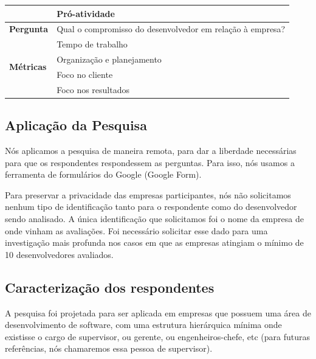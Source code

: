 \begin{table}[h]
\begin{tabular}{|p{2cm}|p{6.25cm}|p{6.25cm}|}
		& \multicolumn{2}{l|}{Pró-atividade}                                                                      \\ \hline\hline
		\textbf{Pergunta}                  & \multicolumn{2}{l|}{\parbox{12cm}{Qual o compromisso do desenvolvedor em relação à empresa?}}                          \\ \hline
		\multirow{4}{*}{\textbf{Métricas}} & \multicolumn{2}{l|}{Tempo de trabalho}                                                                  \\ \cline{2-3} 
		& \multicolumn{2}{l|}{Organização e planejamento}                                                         \\ \cline{2-3} 
		& \multicolumn{2}{l|}{Foco no cliente}                                                                    \\ \cline{2-3} 
		& \multicolumn{2}{l|}{Foco nos resultados}                                                                \\ \hline
	\end{tabular}
\end{table}

\subsection{Aplicação da Pesquisa}

Nós aplicamos a pesquisa de maneira remota, para dar a liberdade necessárias para que os respondentes respondessem as perguntas. Para isso, nós usamos a ferramenta de formulários do Google (Google Form).

Para preservar a privacidade das empresas participantes, nós não solicitamos nenhum tipo de identificação tanto para o respondente como do desenvolvedor sendo analisado. A única identificação que solicitamos foi o nome da empresa de onde vinham as avaliações. Foi necessário solicitar esse dado para uma investigação mais profunda nos casos em que as empresas atingiam o mínimo de 10 desenvolvedores avaliados.

\subsection{Caracterização dos respondentes}

A pesquisa foi projetada para ser aplicada em empresas que possuem uma área de desenvolvimento de software, com uma estrutura hierárquica mínima onde existisse o cargo de supervisor, ou gerente, ou engenheiros-chefe, etc (para futuras referências, nós chamaremos essa pessoa de supervisor).

